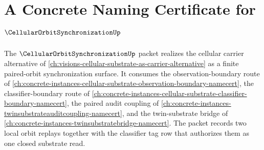 \chapter{A Concrete Naming Certificate for $\CellularOrbitSynchronizationUp$}
\label{ch:concrete-instances-cellular-orbit-synchronization-namecert}

The $\CellularOrbitSynchronizationUp$ packet realizes the cellular carrier alternative of \autoref{ch:visions-cellular-substrate-as-carrier-alternative} as a finite paired-orbit synchronization surface. It consumes the observation-boundary route of \autoref{ch:concrete-instances-cellular-substrate-observation-boundary-namecert}, the classifier-boundary route of \autoref{ch:concrete-instances-cellular-substrate-classifier-boundary-namecert}, the paired audit coupling of \autoref{ch:concrete-instances-twinsubstrateauditcoupling-namecert}, and the twin-substrate bridge of \autoref{ch:concrete-instances-twinsubstratebridge-namecert}. The packet records two local orbit replays together with the classifier tag row that authorizes them as one closed substrate read.


